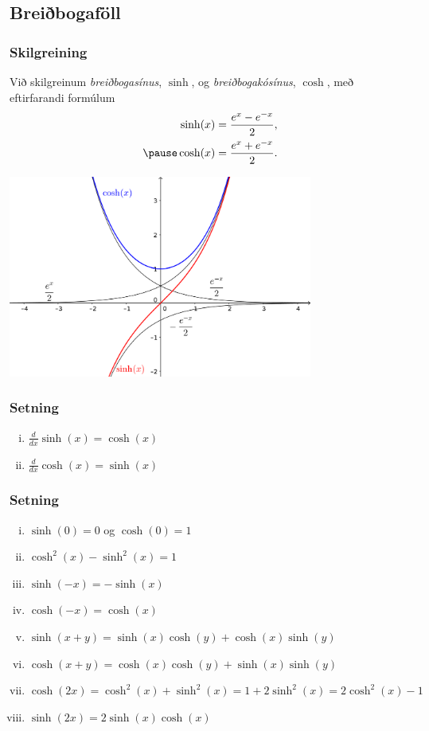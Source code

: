\documentclass[icelandic,a4paper,12pt]{article}
\begin{document}
\subsection{Breiðbogaföll}
\subsubsection{Skilgreining}
Við skilgreinum \emph{breiðbogasínus}, $\sinh$, og 
\emph{breiðbogakósínus},
$\cosh$, með eftirfarandi formúlum  \pause
\begin{eqnarray*}
\sinh(x) &= \frac{e^x - e^{-x}}2,\\ \pause
\cosh(x) &= \frac{e^x + e^{-x}}2.
\end{eqnarray*}
 
\begin{center}
\includegraphics[width=10cm,keepaspectratio=true]{./myndir/kafli04/06_sinh-cosh.png}
\end{center}

\subsubsection{Setning}
\begin{enumerate}[(i)]
\item $\frac d{dx} \sinh(x) = \cosh(x)$
\item $\frac d{dx} \cosh(x) = \sinh(x)$
\end{enumerate}

\subsubsection{Setning}
\begin{enumerate}[(i)]
\item $\sinh(0) = 0$ og $\cosh(0) = 1$ \pause
\item $\cosh^2(x) - \sinh^2(x) = 1$ \pause
\item $\sinh(-x) = -\sinh(x)$ \pause
\item $\cosh(-x) = \cosh(x)$ \pause
\item $\sinh(x+y) = \sinh(x)\cosh(y) + \cosh(x)\sinh(y)$
\item $\cosh(x+y) = \cosh(x)\cosh(y) + \sinh(x)\sinh(y)$ \pause
\item $\cosh(2x) = \cosh^2(x) + \sinh^2(x) = 1+2\sinh^2(x) = 2\cosh^2(x)-1$
\item $\sinh(2x) = 2\sinh(x)\cosh(x)$
\end{enumerate} 
\end{document}
